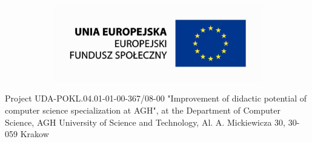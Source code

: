 \documentclass[pdflatex,en]{aghdpl}  %
\begin{document}
\begin{figure}[h!]
\begin{subfigure}[b]{0.1\textwidth}
	\end{subfigure}
	\qquad
	\begin{subfigure}[b]{0.4\textwidth}
		\includegraphics[width=\textwidth, keepaspectratio=true]{images/ue.png}
	\end{subfigure}
\end{figure}

Project UDA-POKL.04.01-01-00-367/08-00 "Improvement of didactic potential
of computer science specialization at AGH", at the Department of Computer
Science, AGH University of Science and Technology, Al. A. Mickiewicza
30, 30-059 Krakow\\

 

\clearpage
\tableofcontents
\clearpage
{}
{}
\listoffigures
\clearpage
{}
{}
\listoftables
\clearpage
{}
{}
\printnomenclature
\clearpage








\clearpage
{}
{}
\glsaddall
\printglossaries
% 
% 

\clearpage
{}
{}
{}

\end{document}
